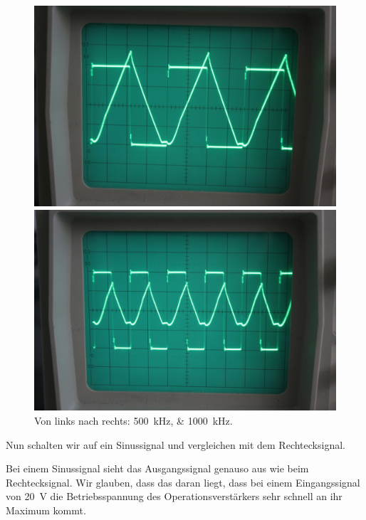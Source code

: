 \begin{figure}[htbp]
	\centering
	\begin{minipage}{.45\linewidth}
		\includegraphics[width=\linewidth]{Oszi_Foto/5-809.jpg}
	\end{minipage}
	\hfill
	\begin{minipage}{.45\linewidth}
		\includegraphics[width=\linewidth]{Oszi_Foto/5-810.jpg}
	\end{minipage}
	\caption{%
		Von links nach rechts: \SIlist{500;1000}{\kilo\hertz}.
	}
	\label{fig:809}
\end{figure}

Nun schalten wir auf ein Sinussignal und vergleichen mit dem Rechtecksignal.

Bei einem Sinussignal sieht das Ausgangssignal genauso aus wie beim
Rechtecksignal. Wir glauben, dass das daran liegt, dass bei einem
Eingangssignal von \SI{20}{\volt} die Betriebsspannung des
Operationsverstärkers sehr schnell an ihr Maximum kommt.

